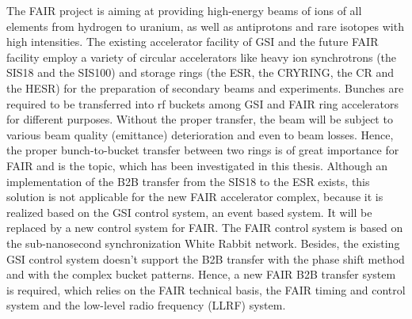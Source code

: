 The FAIR project is aiming at providing high-energy beams of ions of all elements from hydrogen to uranium, as well as antiprotons and rare isotopes with high intensities. The existing accelerator facility of GSI and the future FAIR facility employ a variety of circular accelerators like heavy ion synchrotrons (the SIS18 and the SIS100) and storage rings (the ESR, the CRYRING, the CR and the HESR) for the preparation of secondary beams and experiments. Bunches are required to be transferred into rf buckets among GSI and FAIR ring accelerators for different purposes. Without the proper transfer, the beam will be subject to various beam quality (emittance) deterioration and even to beam losses. Hence, the proper bunch-to-bucket transfer between two rings is of great importance for FAIR and is the topic, which has been investigated in this thesis. Although an implementation of the B2B transfer from the SIS18 to the ESR exists, this solution is not applicable for the new FAIR accelerator complex, because it is realized based on the GSI control system, an event based system. It will be replaced by a new control system for FAIR. The FAIR control system is based on the sub-nanosecond synchronization White Rabbit network. Besides, the existing GSI control system doesn't support the B2B transfer with the phase shift method and with the complex bucket patterns. Hence, a new FAIR B2B transfer system is required, which relies on the FAIR technical basis, the FAIR timing and control system and the low-level radio frequency (LLRF) system.


